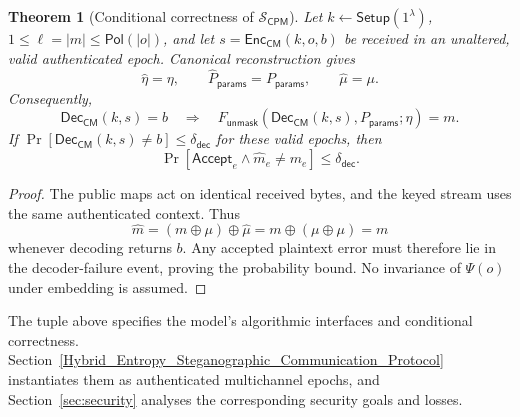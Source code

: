 \documentclass[pdflatex,sn-mathphys-num]{sn-jnl}%
\newtheorem{theorem}{Theorem}
\theoremstyle{definition}
\theoremstyle{game}
\theoremstyle{thmstyleone}%
\theoremstyle{thmstyletwo}%
\theoremstyle{thmstylethree}%
\begin{document}
\begin{theorem}[Conditional correctness of $\mathcal S_{\mathsf{CPM}}$]
\label{thm:CorrectnessHybrid}
Let $k\leftarrow\mathsf{Setup}(1^\lambda)$, $1\le\ell=|m|\le\mathsf{Pol}(|o|)$,
and let $s=\mathsf{Enc}_{\mathsf{CM}}(k,o,b)$ be received in an unaltered,
valid authenticated epoch. Canonical reconstruction gives
\[
\widehat\eta=\eta,\qquad
\widehat P_{\mathsf{params}}=P_{\mathsf{params}},\qquad
\widehat\mu=\mu.
\]
Consequently,
\[
\mathsf{Dec}_{\mathsf{CM}}(k,s)=b
\quad\Longrightarrow\quad
F_{\mathsf{unmask}}(\mathsf{Dec}_{\mathsf{CM}}(k,s),P_{\mathsf{params}};\eta)=m.
\]
If $\Pr[\mathsf{Dec}_{\mathsf{CM}}(k,s)\ne b]\le\delta_{\mathsf{dec}}$ for
these valid epochs, then
\[
\Pr[\mathsf{Accept}_e\wedge\widehat m_e\ne m_e]\le\delta_{\mathsf{dec}}.
\]
\end{theorem}
\begin{proof}
The public maps act on identical received bytes, and the keyed stream uses
the same authenticated context. Thus
\[
\widehat m=(m\oplus\mu)\oplus\widehat\mu
=m\oplus(\mu\oplus\mu)=m
\]
whenever decoding returns $b$. Any accepted plaintext error must therefore
lie in the decoder-failure event, proving the probability bound. No
invariance of $\Psi(o)$ under embedding is assumed.
\end{proof}

The tuple above specifies the model's algorithmic interfaces and conditional
correctness. Section~\ref{Hybrid_Entropy_Steganographic_Communication_Protocol}
instantiates them as authenticated multichannel epochs, and
Section~\ref{sec:security} analyses the corresponding security goals and losses.
\end{document}
